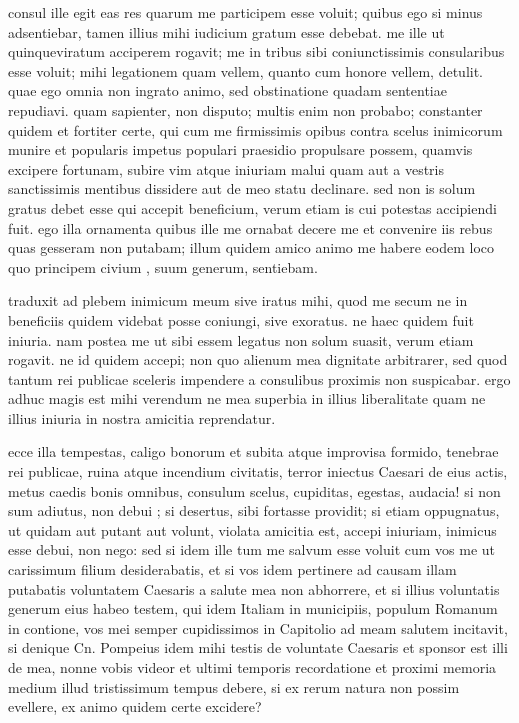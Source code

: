  consul ille egit eas res quarum me participem esse voluit; quibus ego si minus adsentiebar, tamen illius mihi iudicium gratum esse debebat. me ille ut quinqueviratum acciperem rogavit; me in tribus sibi coniunctissimis consularibus esse voluit; mihi legationem quam vellem, quanto cum honore vellem, detulit. quae ego omnia non ingrato animo, sed obstinatione quadam sententiae repudiavi. quam sapienter, non disputo; multis enim non probabo; constanter quidem et fortiter certe, qui cum me firmissimis opibus contra scelus inimicorum munire et popularis impetus populari praesidio propulsare possem, quamvis excipere fortunam, subire vim atque iniuriam malui quam aut a vestris sanctissimis mentibus dissidere aut de meo statu declinare. sed non is solum gratus debet esse qui accepit beneficium, verum etiam is cui potestas accipiendi fuit. ego illa ornamenta quibus ille me ornabat decere me et convenire iis rebus quas gesseram non putabam; illum quidem amico animo me habere eodem loco quo principem civium , suum generum, sentiebam.

 traduxit ad plebem inimicum meum sive iratus mihi, quod me secum ne in beneficiis quidem videbat posse coniungi, sive exoratus. ne haec quidem fuit iniuria. nam postea me ut sibi essem legatus non solum suasit, verum etiam rogavit. ne id quidem accepi; non quo alienum mea dignitate arbitrarer, sed quod tantum rei publicae sceleris impendere a consulibus proximis non suspicabar. ergo adhuc magis est mihi verendum ne mea superbia in illius liberalitate quam ne illius iniuria in nostra amicitia reprendatur.

 ecce illa tempestas, caligo bonorum et subita atque improvisa formido, tenebrae rei publicae, ruina atque incendium civitatis, terror iniectus Caesari de eius actis, metus caedis bonis omnibus, consulum scelus, cupiditas, egestas, audacia! si non sum adiutus, non debui ; si desertus, sibi fortasse providit; si etiam oppugnatus, ut quidam aut putant aut volunt, violata amicitia est, accepi iniuriam, inimicus esse debui, non nego: sed si idem ille tum me salvum esse voluit cum vos me ut carissimum filium desiderabatis, et si vos idem pertinere ad causam illam putabatis voluntatem Caesaris a salute mea non abhorrere, et si illius voluntatis generum eius habeo testem, qui idem Italiam in municipiis, populum Romanum in contione, vos mei semper cupidissimos in Capitolio ad meam salutem incitavit, si denique Cn. Pompeius idem mihi testis de voluntate Caesaris et sponsor est illi de mea, nonne vobis videor et ultimi temporis recordatione et proximi memoria medium illud tristissimum tempus debere, si ex rerum natura non possim evellere, ex animo quidem certe excidere?

